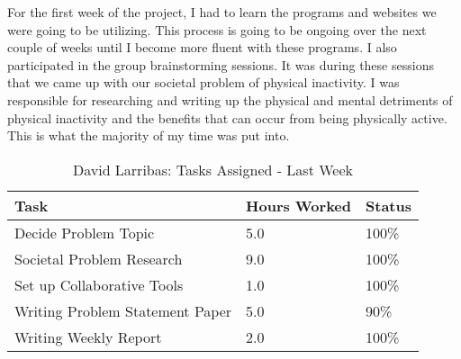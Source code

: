 \documentclass[12pt,article,compsoc]{IEEEtran}
\begin{document}
	For the first week of the project, I had to learn the programs and websites we were going to be utilizing. This process is going to be ongoing over the next couple of weeks until I become more fluent with these programs.  I also participated in the group brainstorming sessions.  It was during these sessions that we came up with our societal problem of physical inactivity.  I was responsible for researching and writing up the physical and mental detriments of physical inactivity and the benefits that can occur from being physically active.  This is what the majority of my time was put into.
	\begin{table}[ht]
	\renewcommand{\arraystretch}{1.3}
		\caption{David Larribas: Tasks Assigned - Last Week}
		
		\label{Summary of David Larribas' activities: last week}
		
		\centering
		\begin{tabular}{p{5.5cm}|p{1cm}|p{1cm}}
		\hline
		\bfseries 	Task		 		& \bfseries Hours Worked	& \bfseries Status	\\
		\hline\hline
					Decide Problem Topic						& 5.0						& 100\%				\\	%
					Societal Problem Research					& 9.0						& 100\%				\\	%
					Set up Collaborative Tools					& 1.0						& 100\%				\\
					Writing Problem Statement Paper				& 5.0						& 90\%				\\
					Writing Weekly Report						& 2.0						& 100\%				\\	
		\hline
		\end{tabular}
	\end{table}
\end{document}
